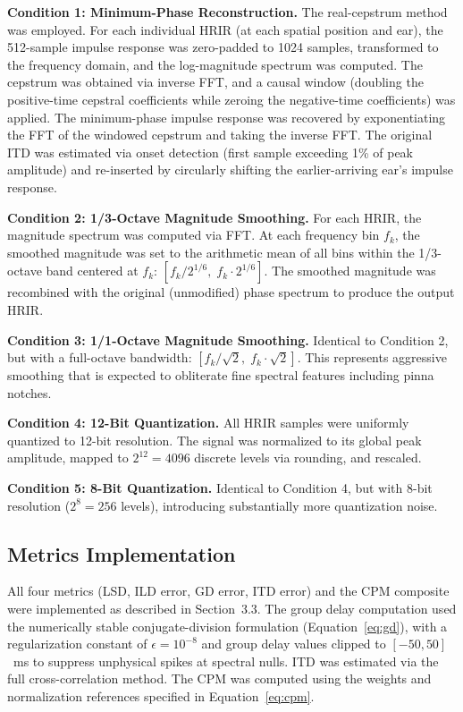 \documentclass[12pt,a4paper]{article}
\begin{document}
\textbf{Condition 1: Minimum-Phase Reconstruction.}
The real-cepstrum method was employed. For each individual HRIR (at each spatial position and ear), the 512-sample impulse response was zero-padded to 1024 samples, transformed to the frequency domain, and the log-magnitude spectrum was computed. The cepstrum was obtained via inverse FFT, and a causal window (doubling the positive-time cepstral coefficients while zeroing the negative-time coefficients) was applied. The minimum-phase impulse response was recovered by exponentiating the FFT of the windowed cepstrum and taking the inverse FFT. The original ITD was estimated via onset detection (first sample exceeding 1\% of peak amplitude) and re-inserted by circularly shifting the earlier-arriving ear's impulse response.

\textbf{Condition 2: 1/3-Octave Magnitude Smoothing.}
For each HRIR, the magnitude spectrum was computed via FFT. At each frequency bin $f_k$, the smoothed magnitude was set to the arithmetic mean of all bins within the 1/3-octave band centered at $f_k$: $[f_k / 2^{1/6},\; f_k \cdot 2^{1/6}]$. The smoothed magnitude was recombined with the original (unmodified) phase spectrum to produce the output HRIR.

\textbf{Condition 3: 1/1-Octave Magnitude Smoothing.}
Identical to Condition 2, but with a full-octave bandwidth: $[f_k / \sqrt{2},\; f_k \cdot \sqrt{2}]$. This represents aggressive smoothing that is expected to obliterate fine spectral features including pinna notches.

\textbf{Condition 4: 12-Bit Quantization.}
All HRIR samples were uniformly quantized to 12-bit resolution. The signal was normalized to its global peak amplitude, mapped to $2^{12} = 4096$ discrete levels via rounding, and rescaled.

\textbf{Condition 5: 8-Bit Quantization.}
Identical to Condition 4, but with 8-bit resolution ($2^8 = 256$ levels), introducing substantially more quantization noise.

\subsection{Metrics Implementation}

All four metrics (LSD, ILD error, GD error, ITD error) and the CPM composite were implemented as described in Section~3.3. The group delay computation used the numerically stable conjugate-division formulation (Equation~\ref{eq:gd}), with a regularization constant of $\epsilon = 10^{-8}$ and group delay values clipped to $[-50, 50]$~ms to suppress unphysical spikes at spectral nulls. ITD was estimated via the full cross-correlation method. The CPM was computed using the weights and normalization references specified in Equation~\ref{eq:cpm}.
\end{document}
